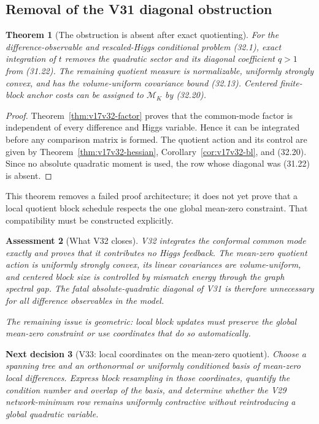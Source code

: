 \documentclass[11pt]{article}
\newtheorem{theorem}{Theorem}[section]
\newtheorem{decision}[theorem]{Next decision}
\newtheorem{assessment}[theorem]{Assessment}
\theoremstyle{remark}
\begin{document}
\subsection{Removal of the V31 diagonal obstruction}

\begin{theorem}[The obstruction is absent after exact quotienting]
\label{thm:v17v32-removal}
For the difference-observable and rescaled-Higgs conditional problem
(32.1), exact integration of \(t\) removes the quadratic sector and its
diagonal coefficient \(q>1\) from (31.22).  The remaining quotient
measure is normalizable, uniformly strongly convex, and has the
volume-uniform covariance bound (32.13).  Centered finite-block anchor
costs can be assigned to \(\mathcal M_K\) by (32.20).
\end{theorem}

\begin{proof}
Theorem~\ref{thm:v17v32-factor} proves that the common-mode factor is
independent of every difference and Higgs variable.  Hence it can be
integrated before any comparison matrix is formed.  The quotient action
and its control are given by Theorem~\ref{thm:v17v32-hessian},
Corollary~\ref{cor:v17v32-bl}, and (32.20).  Since no absolute
quadratic moment is used, the row whose diagonal was (31.22) is absent.
\end{proof}

This theorem removes a failed proof architecture; it does not yet prove
that a local quotient block schedule respects the one global mean-zero
constraint.  That compatibility must be constructed explicitly.

\begin{assessment}[What V32 closes]
\label{ass:v17v32-status}
V32 integrates the conformal common mode exactly and proves that it
contributes no Higgs feedback.  The mean-zero quotient action is
uniformly strongly convex, its linear covariances are volume-uniform,
and centered block size is controlled by mismatch energy through the
graph spectral gap.  The fatal absolute-quadratic diagonal of V31 is
therefore unnecessary for all difference observables in the model.

The remaining issue is geometric: local block updates must preserve the
global mean-zero constraint or use coordinates that do so automatically.
\end{assessment}

\begin{decision}[V33: local coordinates on the mean-zero quotient]
\label{dec:v17v32-next}
Choose a spanning tree and an orthonormal or uniformly conditioned basis
of mean-zero local differences.  Express block resampling in those
coordinates, quantify the condition number and overlap of the basis,
and determine whether the V29 network-minimum row remains uniformly
contractive without reintroducing a global quadratic variable.
\end{decision}
\end{document}
